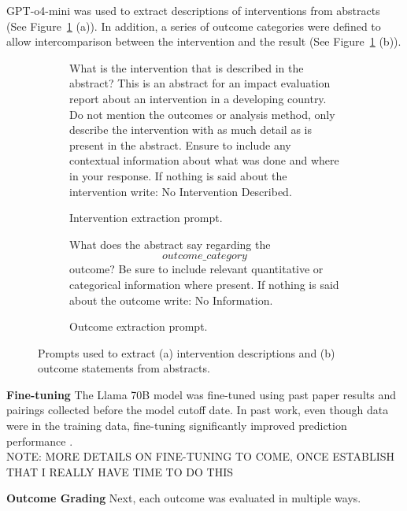 \documentclass[12pt,a4paper]{article}
\begin{document}
GPT-o4-mini was used to extract descriptions of interventions from abstracts (See Figure~\ref{fig:prompts-ib} (a)). In addition, a series of outcome categories were defined to allow intercomparison between the intervention and the result (See Figure~\ref{fig:prompts-ib} (b)). 

\begin{figure}[htbp]
  \centering
  \begin{subfigure}{0.48\textwidth}
    \begin{tcolorbox}[left=4pt, right=4pt, top=4pt, bottom=4pt]
\ttfamily\footnotesize
What is the intervention that is described in the abstract? 
This is an abstract for an impact evaluation report about an intervention in a developing country. 
Do not mention the outcomes or analysis method, only describe the intervention with as much detail as is present in the abstract. 
Ensure to include any contextual information about what was done and where in your response. 
If nothing is said about the intervention write: No Intervention Described.
    \end{tcolorbox}
    \caption{Intervention extraction prompt.}
  \end{subfigure}\hfill
  \begin{subfigure}{0.48\textwidth}
    \begin{tcolorbox}[left=4pt, right=4pt, top=4pt, bottom=4pt]
\ttfamily\footnotesize
What does the abstract say regarding the \[outcome\_category\] outcome? 
Be sure to include relevant quantitative or categorical information where present. 
If nothing is said about the outcome write: No Information.
    \end{tcolorbox}
    \caption{Outcome extraction prompt.}
  \end{subfigure}
  \caption{Prompts used to extract (a) intervention descriptions and (b) outcome statements from abstracts.}
  \label{fig:prompts-ib}
\end{figure}

\textbf{Fine-tuning}
The Llama 70B model was fine-tuned using past paper results and pairings collected before the model cutoff date. In past work, even though data were in the training data, fine-tuning significantly improved prediction performance . \\


NOTE: MORE DETAILS ON FINE-TUNING TO COME, ONCE ESTABLISH THAT I REALLY HAVE TIME TO DO THIS %


\textbf{Outcome Grading}
Next, each outcome was evaluated in multiple ways.
\end{document}
